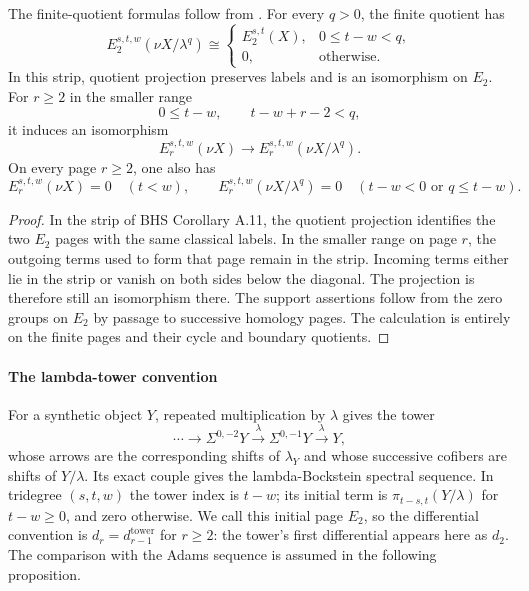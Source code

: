\begin{proposition}
\label{sem:Literature:finite-quotient-labels}
\label{sem:Literature:vanishing-and-degeneration}
The finite-quotient formulas follow from \cite[Theorem A.8 and Corollary A.11]{BHS}.
For every $q>0$, the finite quotient has
\[
 E_2^{s,t,w}(\nu X/\lambda^q)\cong
 \begin{cases}E_2^{s,t}(X),&0\le t-w<q,\\0,&\text{otherwise}.
 \end{cases}
\]
In this strip, quotient projection preserves labels and is an
isomorphism on $E_2$. For $r\ge2$ in the smaller range
\[
 0\le t-w,\qquad t-w+r-2<q,
\]
it induces an isomorphism
\[
 E_r^{s,t,w}(\nu X)\longrightarrow E_r^{s,t,w}(\nu X/\lambda^q).
\]
On every page $r\ge2$, one also has
\[
 E_r^{s,t,w}(\nu X)=0\quad(t<w),\qquad
 E_r^{s,t,w}(\nu X/\lambda^q)=0\quad(t-w<0\text{ or }q\le t-w).
\]

\end{proposition}
\begin{proof}
In the strip of BHS Corollary A.11, the quotient projection identifies
the two $E_2$ pages with the same classical labels. In the smaller
range on page $r$, the outgoing terms used to form that page remain
in the strip. Incoming terms either lie in the strip or vanish on
both sides below the diagonal. The projection is therefore still an
isomorphism there.
The support assertions follow from the zero groups on $E_2$ by passage
to successive homology pages. The calculation is entirely on the finite pages and their cycle and boundary quotients.
\end{proof}

\paragraph*{The lambda-tower convention}
For a synthetic object $Y$, repeated multiplication by $\lambda$ gives
the tower
\[
 \cdots\longrightarrow\Sigma^{0,-2}Y
 \xrightarrow{\lambda}\Sigma^{0,-1}Y\xrightarrow{\lambda}Y,
\]
whose arrows are the corresponding shifts of $\lambda_Y$ and whose
successive cofibers are shifts of $Y/\lambda$. Its exact couple gives
the lambda-Bockstein spectral sequence. In tridegree $(s,t,w)$ the
tower index is $t-w$; its initial term is
$\pi_{t-s,t}(Y/\lambda)$ for $t-w\ge0$, and zero otherwise.
We call this initial page $E_2$, so the differential convention is
$d_r=d_{r-1}^{\mathrm{tower}}$ for $r\ge2$: the tower's first
differential appears here as $d_2$. The comparison with the Adams
sequence is assumed in the following proposition.

